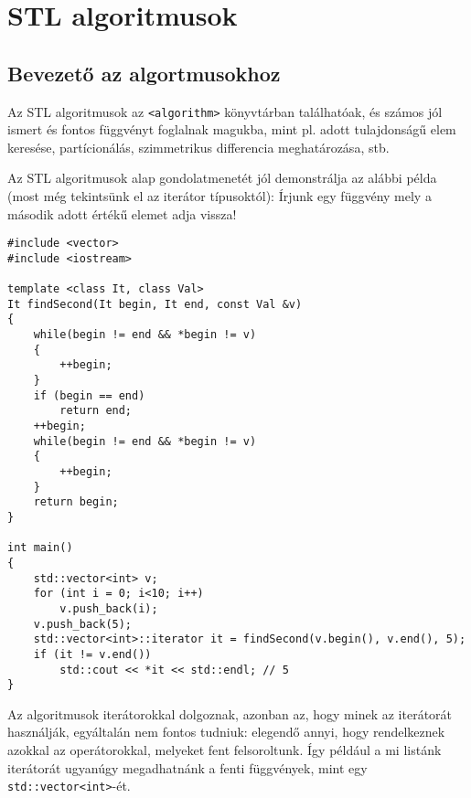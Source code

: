 \documentclass[a4paper,11.5pt]{article}
\begin{document}
	\section{STL algoritmusok}
	\subsection{Bevezető az algortmusokhoz}
	Az STL algoritmusok az \texttt{<algorithm>} könyvtárban találhatóak, és számos jól ismert és fontos függvényt foglalnak magukba, mint pl. adott tulajdonságű elem keresése, partícionálás, szimmetrikus differencia meghatározása, stb.
	\medskip
	
	Az STL algoritmusok alap gondolatmenetét jól demonstrálja az alábbi példa (most még tekintsünk el az iterátor típusoktól): Írjunk egy függvény mely a második adott értékű elemet adja vissza!
	\begin{lstlisting}
#include <vector>
#include <iostream>

template <class It, class Val>
It findSecond(It begin, It end, const Val &v)
{
	while(begin != end && *begin != v)
	{
		++begin;
	}
	if (begin == end)
		return end;
	++begin;
	while(begin != end && *begin != v)
	{
		++begin;
	}
	return begin;
}

int main()
{
	std::vector<int> v;
	for (int i = 0; i<10; i++)
		v.push_back(i);
	v.push_back(5);
	std::vector<int>::iterator it = findSecond(v.begin(), v.end(), 5);
	if (it != v.end())
		std::cout << *it << std::endl; // 5
}
	\end{lstlisting}
	
	Az algoritmusok iterátorokkal dolgoznak, azonban az, hogy minek az iterátorát használják, egyáltalán nem fontos tudniuk: elegendő annyi, hogy rendelkeznek azokkal az operátorokkal, melyeket fent felsoroltunk. Így például a mi listánk iterátorát ugyanúgy megadhatnánk a fenti függvények, mint egy \texttt{std::vector<int>}-ét.
	
	
\end{document}
